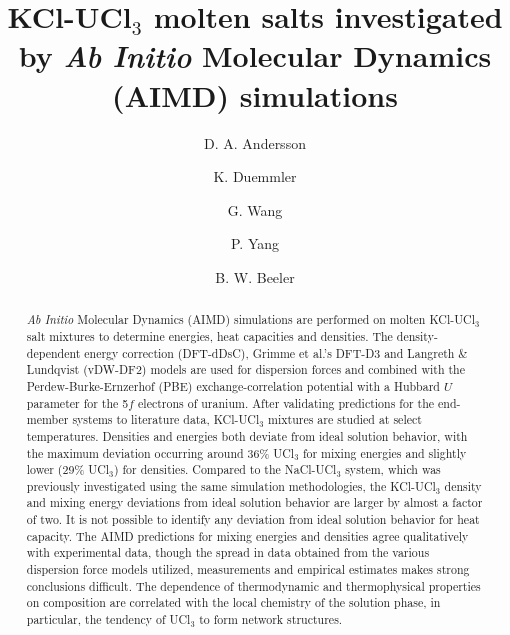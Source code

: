 \documentclass[preprint,3p,10pt,twocolumn,number,sort&compress]{elsarticle}
\begin{document}
\begin{frontmatter}

\title{KCl-UCl$_3$ molten salts investigated by \textit{Ab Initio} Molecular Dynamics (AIMD) simulations}


\author[label1]{D. A. Andersson}
\author[label2]{K. Duemmler}
\author[label1]{G. Wang}
\author[label1]{P. Yang}
\author[label2,label3]{B. W. Beeler}

\address[label1]{Materials Science and Technology Division, Los Alamos National Laboratory P.O. Box 1663, Los Alamos, NM 87545, USA}
\address[label2]{Department of Nuclear Engineering, North Carolina State University, Raleigh, NC, United States}
\address[label3]{Idaho National Laboratory, Idaho Falls, ID 83415, United States}


\begin{abstract}

\textit{Ab Initio} Molecular Dynamics (AIMD) simulations are performed on molten KCl-UCl$_3$ salt mixtures to determine energies, heat capacities and densities. 
The density-dependent energy correction (DFT-dDsC), Grimme et al.'s DFT-D3 and Langreth \& Lundqvist (vDW-DF2) models are used for dispersion forces and combined with the Perdew-Burke-Ernzerhof (PBE) exchange-correlation potential with a Hubbard $U$ parameter for the 5$f$ electrons of uranium. 
After validating predictions for the end-member systems to literature data, KCl-UCl$_3$ mixtures are studied at select temperatures. Densities and energies both deviate from ideal solution behavior, with the maximum deviation occurring around 36\% UCl$_3$ for mixing energies and slightly lower (29\% UCl$_3$) for densities.
Compared to the NaCl-UCl$_3$ system, which was previously investigated using the same simulation methodologies, the KCl-UCl$_3$ density and mixing energy deviations from ideal solution behavior are larger by almost a factor of two. %
It is not possible to identify any deviation from ideal solution behavior for heat capacity. The AIMD predictions for mixing energies and densities agree qualitatively with experimental data, though the spread in data obtained from the various dispersion force models utilized, measurements and empirical estimates makes strong conclusions difficult. The dependence of thermodynamic and thermophysical properties on composition are correlated with the local chemistry of the solution phase, in particular, the tendency of UCl$_3$ to form network structures.  
\end{abstract}




\end{frontmatter}
\end{document}
